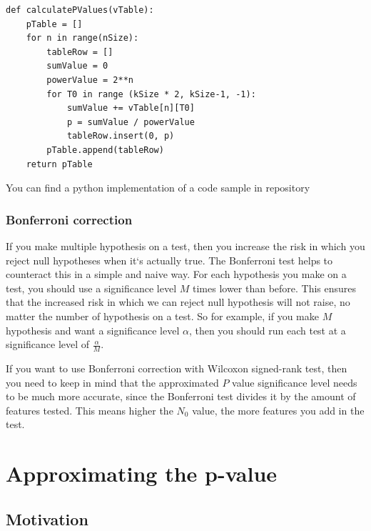 \documentclass[12pt]{article}
\begin{document}
{\begin{lstlisting}
def calculatePValues(vTable):
    pTable = []
    for n in range(nSize):
        tableRow = []
        sumValue = 0
        powerValue = 2**n
        for T0 in range (kSize * 2, kSize-1, -1):
            sumValue += vTable[n][T0]
            p = sumValue / powerValue
            tableRow.insert(0, p)
        pTable.append(tableRow)
    return pTable

\end{lstlisting}

You can find a python implementation of a code sample in repository ~\cite{stenver_repo_p_accurate_table_py}

\subsubsection{Bonferroni correction}

If you make multiple hypothesis on a test, then you increase the risk in which you reject null hypotheses when it`s actually true. The Bonferroni test helps to counteract this in a simple and naive way. For each hypothesis you make on a test, you should use a significance level $M$ times lower than before. This ensures that the increased risk in which we can reject null hypothesis will not raise, no matter the number of hypothesis on a test. So for example, if you make $M$ hypothesis and want a significance level $\alpha$,  then you should run each test at a significance level of $\frac{\alpha}{M}$.

If you want to use Bonferroni correction with Wilcoxon signed-rank test, then you need to keep in mind that the approximated $P$ value significance level needs to be much more accurate, since the Bonferroni test divides it by the amount of features tested. This means higher the $N_0$ value, the more features you add in the test.

\newpage

\section{Approximating the p-value}
\label{sec:approximating_p_value}

\subsection{Motivation}

}
\end{document}
